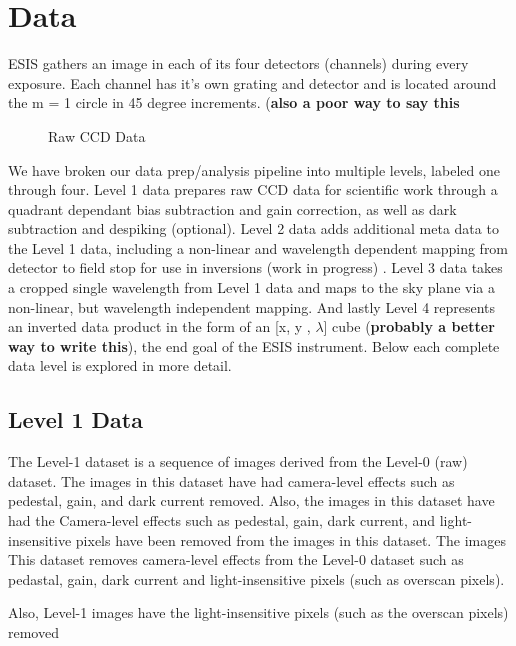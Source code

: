 	
\section{Data}
    ESIS gathers an image in each of its four detectors (channels) during every exposure.  
    Each channel has it's own grating and detector and is located around the m = 1 circle in 45 degree increments. (\textbf{also a poor way to say this}
    
    \begin{figure}
        \centering
        \caption{Raw CCD Data}
        \label{fig:Level0}
    \end{figure}
    
    We have broken our data prep/analysis pipeline into multiple levels, labeled one through four.
    Level 1 data prepares raw CCD data for scientific work through a quadrant dependant bias subtraction and gain correction, as well as dark subtraction and despiking (optional).
    Level 2 data adds additional meta data to the Level 1 data, including a non-linear and wavelength dependent mapping from detector to field stop for use in inversions (work in progress) .
    Level 3 data takes a cropped single wavelength from Level 1 data and maps to the sky plane via a non-linear, but wavelength independent mapping.
    And lastly Level 4 represents an inverted data product in the form of an [x, y , $\lambda$] cube (\textbf{probably a better way to write this}), the end goal of the ESIS instrument.
    Below each complete data level is explored in more detail.
    
    \subsection{Level 1 Data}
    
        The Level-1 dataset is a sequence of images derived from the Level-0 (raw) dataset.
        The images in this dataset have had camera-level effects such as pedestal, gain, and dark current removed.
        Also, the images in this dataset have had the 
        Camera-level effects such as pedestal, gain, dark current, and light-insensitive pixels have been removed from the images in this dataset.
        The images 
        This dataset removes camera-level effects from the Level-0 dataset such as pedastal, gain, dark current and light-insensitive pixels (such as overscan pixels).
        
        
        Also, Level-1 images have the light-insensitive pixels (such as the overscan pixels) removed 
    
